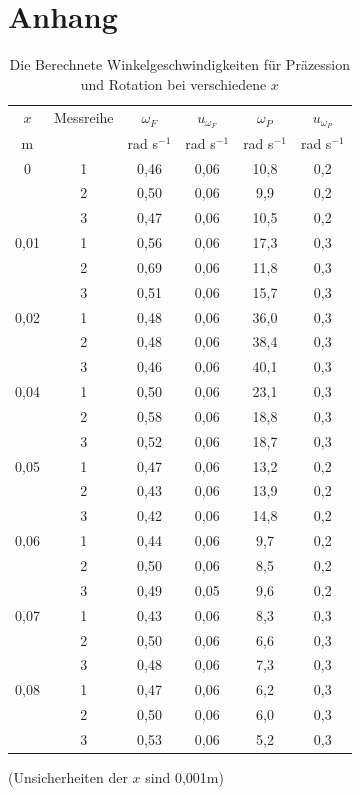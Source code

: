 \documentclass[11pt,a4paper]{article} %
\begin{document}
\section{Anhang}

\begin{table}[h]
	\centering
	\begin{tabular*}{0.99\textwidth}{@{\extracolsep{\fill}}cccccc}
		\toprule
		$x$ & Messreihe & $\omega_F$ & $u_{\omega_F}$ & $\omega_P$ & $u_{\omega_P}$ \\
		m &  & rad s$^{-1}$ & rad s$^{-1}$ & rad s$^{-1}$& rad s$^{-1}$    \\
		\bottomrule
		0 & 1 & 0,46 & 0,06 & 10,8 & 0,2 \\
		& 2 & 0,50 & 0,06 & 9,9 & 0,2 \\
		 & 3 & 0,47 & 0,06 & 10,5 & 0,2 \\
		0,01 & 1 & 0,56 & 0,06 & 17,3 & 0,3\\
		& 2 & 0,69 & 0,06 & 11,8 & 0,3 \\
		& 3 & 0,51 & 0,06 & 15,7 & 0,3 \\
		0,02 & 1 & 0,48 & 0,06 & 36,0  &  0,3\\
		& 2 & 0,48 &0,06 & 38,4 & 0,3  \\
		& 3 & 0,46 & 0,06 & 40,1 & 0,3 \\
		0,04 & 1 & 0,50 & 0,06 & 23,1&0,3 \\
		& 2 & 0,58 &0,06&18,8&0,3 \\
		& 3 & 0,52 &0,06&18,7&0,3 \\
		0,05 & 1 & 0,47 &0,06&13,2&0,2 \\
		& 2 & 0,43&0,06&13,9&0,2 \\
		& 3 & 0,42&0,06&14,8&0,2 \\
		0,06 & 1 & 0,44 & 0,06 &9,7&0,2 \\
		& 2 & 0,50 & 0,06&8,5&0,2 \\
		& 3 & 0,49 & 0,05&9,6&0,2 \\
		0,07 & 1 & 0,43 &0,06&8,3&0,3 \\
		& 2 & 0,50&0,06&6,6&0,3 \\
		& 3 & 0,48&0,06&7,3&0,3 \\
		0,08 & 1 & 0,47 & 0,06&6,2&0,3 \\
		& 2 & 0,50 & 0,06&6,0&0,3 \\
		& 3 & 0,53&0,06&5,2&0,3 \\
		\bottomrule
	\end{tabular*}
	\caption{Die Berechnete Winkelgeschwindigkeiten für Präzession und Rotation bei verschiedene $x$}
	\label{tabelle}
\end{table}
(Unsicherheiten der $x$ sind 0,001m)
\end{document}
